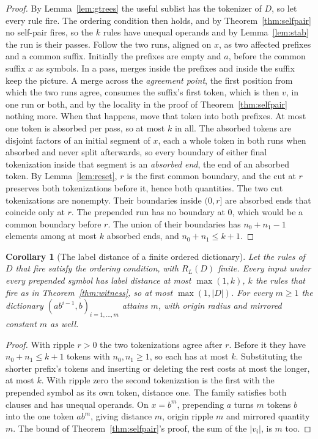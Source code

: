 \documentclass[11pt,a4paper]{article}
\theoremstyle{definition}
\theoremstyle{plain}
\newtheorem{corollary}{Corollary}
\newcommand{\ripple}{R_{L}}
\begin{document}
\begin{proof}
By Lemma~\ref{lem:gtrees} the useful sublist has the tokenizer of \(D\), so let every rule fire. The ordering condition
then holds, and by Theorem~\ref{thm:selfpair} no self-pair fires, so the \(k\) rules have unequal operands and by
Lemma~\ref{lem:stab} the run is their passes. Follow the two runs, aligned on \(x\), as two affected prefixes and a
common suffix. Initially the prefixes are empty and \(a\), before the common suffix \(x\) as symbols. In a pass, merges
inside the prefixes and inside the suffix keep the picture. A merge across the \emph{agreement point}, the first
position from which the two runs agree, consumes the suffix's first token, which is then \(v\), in one run or both, and
by the locality in the proof of Theorem~\ref{thm:selfpair} nothing more. When that happens, move that token into both
prefixes. At most one token is absorbed per pass, so at most \(k\) in all. The absorbed tokens are disjoint factors of
an initial segment of \(x\), each a whole token in both runs when absorbed and never split afterwards, so every boundary
of either final tokenization inside that segment is an \emph{absorbed end}, the end of an absorbed token. By
Lemma~\ref{lem:reset}, \(r\) is the first common boundary, and the cut at \(r\) preserves both tokenizations before it,
hence both quantities. The two cut tokenizations are nonempty. Their boundaries inside \((0, r]\) are absorbed ends that
coincide only at \(r\). The prepended run has no boundary at \(0\), which would be a common boundary before \(r\). The
union of their boundaries has \(n_0 + n_1 - 1\) elements among at most \(k\) absorbed ends, and \(n_0 + n_1 \le k + 1\).
\end{proof}

\begin{corollary}[The label distance of a finite ordered dictionary]\label{cor:labelm}
Let the rules of \(D\) that fire satisfy the ordering condition, with \(\ripple(D)\) finite. Every input under every
prepended symbol has label distance at most \(\max(1, k)\), \(k\) the rules that fire as in Theorem~\ref{thm:witness},
so at most \(\max(1, |D|)\). For every \(m \ge 1\) the dictionary \((ab^{i-1}, b)_{i = 1, \dots, m}\) attains \(m\),
with origin radius and mirrored constant \(m\) as well.
\end{corollary}

\begin{proof}
With ripple \(r > 0\) the two tokenizations agree after \(r\). Before it they have \(n_0 + n_1 \le k + 1\) tokens with
\(n_0, n_1 \ge 1\), so each has at most \(k\). Substituting the shorter prefix's tokens and inserting or deleting the
rest costs at most the longer, at most \(k\). With ripple zero the second tokenization is the first with the prepended
symbol as its own token, distance one. The family satisfies both clauses and has unequal operands. On \(x = b^m\),
prepending \(a\) turns \(m\) tokens \(b\) into the one token \(ab^m\), giving distance \(m\), origin ripple \(m\) and
mirrored quantity \(m\). The bound of Theorem~\ref{thm:selfpair}'s proof, the sum of the \(|v_i|\), is \(m\) too.
\end{proof}
\end{document}

